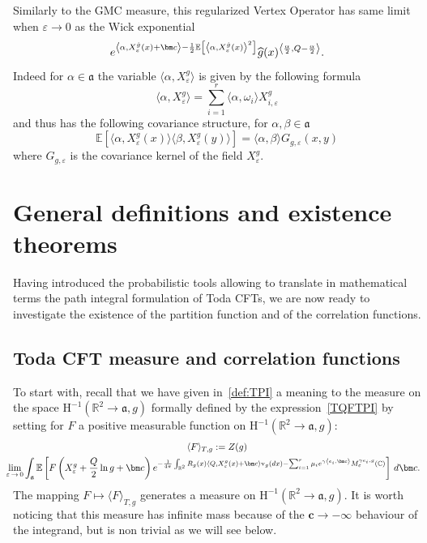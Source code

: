 \documentclass[10pt]{amsart}
\theoremstyle{definition}\newtheorem{defi}[theo]{Definition}\newtheorem{rema}[theo]{Remark}\newtheorem{exam}[theo]{Example}\newtheorem{exem}[theo]{Example}\newtheorem{nota}[theo]{Notation}
\newcommand{\frka}{\mathfrak{a}}
\newcommand{\rmv}{\mathrm{v}}
\newcommand{\rmH}{\mathrm{H}}
\newcommand{\C}{\mathbb{C}}
\newcommand{\R}{\mathbb{R}}
\newcommand{\E}{\mathbb{E}}
\newcommand*\eps{\varepsilon}
\newcommand{\expect}[1]{\mathbb{E}\left[#1\right]}
\let\oldhat\hat
\renewcommand*{\hat}[1]{\mathchoice{\widehat{#1}}{\widehat{#1}}{\oldhat{#1}}{\oldhat{#1}}}
\begin{document}
Similarly to the GMC measure, this regularized Vertex Operator has same limit when $\eps\rightarrow0$ as the Wick exponential
\begin{equation}\label{VO_wick}
e^{\left\langle\alpha, X^{\hat g}_\eps(x) + \bm c\right\rangle-\frac12\expect{\left\langle\alpha, X^{\hat g}_\eps(x)\right\rangle^2}} \hat g(x)^{\left\langle\frac{\alpha}2,Q-\frac{\alpha }2\right\rangle}.
\end{equation}
Indeed for $\alpha\in \frka$ the variable $ \langle\alpha, X^g_\eps \rangle$ is given by the following formula
\begin{equation*}
\langle\alpha, X^g_\eps \rangle= \sum_{i=1}^{r} \langle\alpha,\omega_i\rangle X^g_{i,\eps}
\end{equation*}
and thus has the following covariance structure, for $\alpha,\beta\in\frka$
\begin{equation}\label{covX}
\E\left[\langle\alpha, X^g_\eps(x) \rangle \langle\beta, X^g_\eps(y) \rangle\right] = \langle\alpha, \beta \rangle G_{g,\eps}(x,y)
\end{equation}
where $G_{g,\eps}$ is the covariance kernel of the field $X^g_{\eps}$.



\section{General definitions and existence theorems}

Having introduced the probabilistic tools allowing to translate in mathematical terms the path integral formulation of Toda CFTs, we are now ready to investigate the existence of the partition function and of the correlation functions.

\subsection{Toda CFT measure and correlation functions}


To start with, recall that we have given in~\eqref{def:TPI} a meaning to the measure on the space $\rmH^{-1}(\R^2\to \frka,g)$ formally defined by the expression~\eqref{TQFTPI} by setting for $F$ a positive measurable function on $\rmH^{-1}(\R^2\to \frka,g)$:
\begin{multline*}
\langle F\rangle_{T,g} :=Z(g)\\
\mkern-15mu\lim\limits_{\eps\,\rightarrow\,0}\int_{\frka}\E\left[F\left(X^g_\eps+\frac Q2\ln g+\bm c\right)e^{-\frac{1}{4 \pi} \int_{\R^2} R_g(x) \left\langle Q, X^g_\eps(x)+\bm c \right\rangle \rmv_ g(dx) -\sum_{i=1}^{r} \mu_i e^{\gamma \left\langle e_i, \bm c\right\rangle }M^{ \gamma e_i,g}_\eps(\C) }\right]\,d\bm c.
\end{multline*}
The mapping $F\mapsto \langle F\rangle_{T,g}$ generates a measure on $\rmH^{-1}(\R^2\to \frka,g)$. It is worth noticing that this measure has infinite mass because of the $\bm c \rightarrow -\infty$ behaviour of the integrand, but is non trivial as we will see below.
\end{document}
